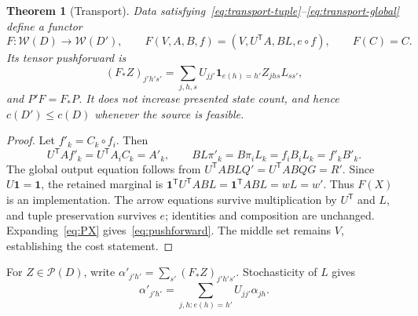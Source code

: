 \documentclass[11pt]{article}
\newcommand{\one}{\mathbf 1}
\newcommand{\W}{\mathcal W}
\newcommand{\Pcal}{\mathcal P}
\newtheorem{theorem}{Theorem}[section]
\theoremstyle{remark}
\begin{document}
\begin{theorem}[Transport]\label{thm:transport}
Data satisfying~\eqref{eq:transport-tuple}--\eqref{eq:transport-global} define a functor
\[
 F:\W(D)\longrightarrow\W(D'),\qquad
 F(V,A,B,f)=(V,U^{\mathsf T}A,BL,e\circ f),\qquad F(C)=C.
\]
Its tensor pushforward is
\begin{equation}\label{eq:pushforward}
 (F_*Z)_{j'h's'}
 =\sum_{j,h,s}U_{jj'}\mathbf1_{e(h)=h'}Z_{jhs}L_{ss'},
\end{equation}
and $P'F=F_*P$. It does not increase presented state count, and hence $c(D')\le c(D)$ whenever the source is feasible.
\end{theorem}
\begin{proof}
Let $f'_k=C_k\circ f_i$. Then
\[
 U^{\mathsf T}Af'_k=U^{\mathsf T}A_iC_k=A'_k,
 \qquad BL\pi'_k=B\pi_iL_k=f_iB_iL_k=f'_kB'_k.
\]
The global output equation follows from
$U^{\mathsf T}ABLQ'=U^{\mathsf T}ABQG=R'$.
Since $U\one=\one$, the retained marginal is
$\one^{\mathsf T}U^{\mathsf T}ABL=\one^{\mathsf T}ABL=wL=w'$.
Thus $F(X)$ is an implementation. The arrow equations survive multiplication by $U^{\mathsf T}$ and $L$, and tuple preservation survives $e$; identities and composition are unchanged. Expanding~\eqref{eq:PX} gives~\eqref{eq:pushforward}. The middle set remains $V$, establishing the cost statement.
\end{proof}

For $Z\in\Pcal(D)$, write $\alpha'_{j'h'}=\sum_{s'}(F_*Z)_{j'h's'}$. Stochasticity of $L$ gives
\begin{equation}\label{eq:alpha-push}
 \alpha'_{j'h'}=\sum_{j,h:e(h)=h'}U_{jj'}\alpha_{jh}.
\end{equation}
\end{document}
